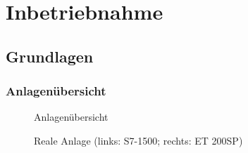 \section{Inbetriebnahme}

\subsection{Grundlagen}

\subsubsection{Anlagenübersicht}

\begin{figure}[H]
   \centering
   \caption[Anlagenübersicht]{Anlagenübersicht}
   \label{fig:Bild6.1}
\end{figure}

\begin{figure}[H]
   \centering
   \caption[Reale Anlage]{Reale Anlage (links: S7-1500; rechts: ET 200SP)}
   \label{fig:Bild6.2}
\end{figure}

